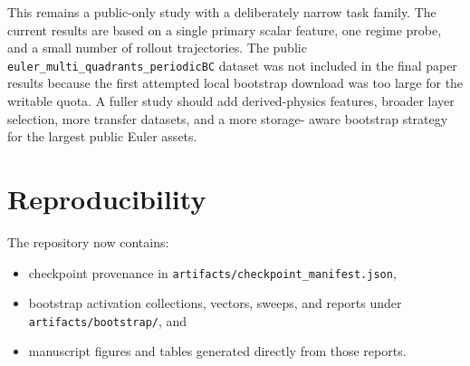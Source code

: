 \documentclass[11pt]{article}
\begin{document}
This remains a public-only study with a deliberately narrow task family. The
current results are based on a single primary scalar feature, one regime probe,
and a small number of rollout trajectories. The public
\texttt{euler\_multi\_quadrants\_periodicBC} dataset was not included in the
final paper results because the first attempted local bootstrap download was
too large for the writable quota. A fuller study should add derived-physics
features, broader layer selection, more transfer datasets, and a more storage-
aware bootstrap strategy for the largest public Euler assets.

\section{Reproducibility}

The repository now contains:
\begin{itemize}
\item checkpoint provenance in \texttt{artifacts/checkpoint\_manifest.json},
\item bootstrap activation collections, vectors, sweeps, and reports under
\texttt{artifacts/bootstrap/}, and
\item manuscript figures and tables generated directly from those reports.
\end{itemize}
\end{document}
